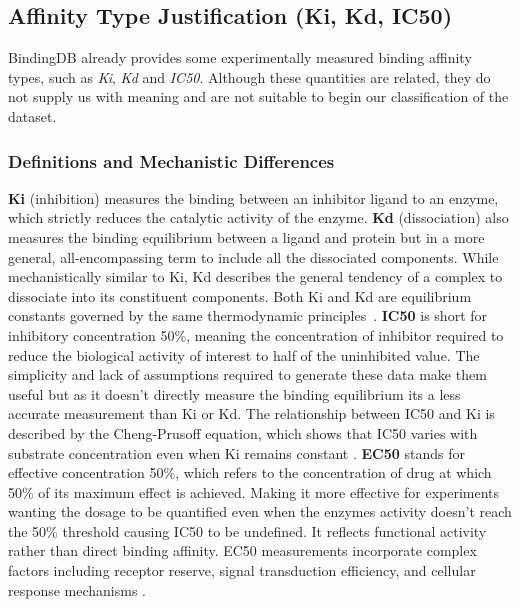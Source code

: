 \subsection{Affinity Type Justification (Ki, Kd, IC50)}
BindingDB already provides some experimentally measured binding affinity types, such as \textit{Ki}, \textit{Kd} and \textit{IC50}. Although these quantities are related, they do not supply us with meaning and are not suitable to begin our classification of the dataset. 
\subsubsection{Definitions and Mechanistic Differences}
\textbf{Ki} (inhibition) measures the binding between an inhibitor ligand to an enzyme, which strictly reduces the catalytic activity of the enzyme. 
\textbf{Kd} (dissociation) also measures the binding equilibrium between a ligand and protein but in a more general, all-encompassing term to include all the dissociated components. While mechanistically similar to Ki, Kd describes the general tendency of a complex to dissociate into its constituent components. Both Ki and Kd are equilibrium constants governed by the same thermodynamic principles~\citep{sciencesnail_ki_kd}.
\textbf{IC50} is short for inhibitory concentration 50\%, meaning the concentration of inhibitor required to reduce the biological activity of interest to half of the uninhibited value. The simplicity and lack of assumptions required to generate these data make them useful but as it doesn't directly measure the binding equilibrium its a less accurate measurement than Ki or Kd. The relationship between IC50 and Ki is described by the Cheng-Prusoff equation, which shows that IC50 varies with substrate concentration even when Ki remains constant \citep{cheng_prusoff}.
\textbf{EC50} stands for effective concentration 50\%, which refers to the concentration of drug at which 50\% of its maximum effect is achieved. Making it more effective for experiments wanting the dosage to be quantified even when the enzymes activity doesn't reach the 50\% threshold causing IC50 to be undefined. It reflects functional activity rather than direct binding affinity. EC50 measurements incorporate complex factors including receptor reserve, signal transduction efficiency, and cellular response mechanisms \citep{sciencesnail_ki_kd}.
